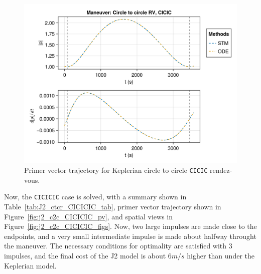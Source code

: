 \begin{figure}[htbp]
    \centering
    \includegraphics[width=\linewidth]{../results/j2/hohmann/CICIC_primer_vector.png}
    \caption{Primer vector trajectory for Keplerian circle to circle \texttt{CICIC} rendez-vous.}
    \label{fig:j2_c2c_CICIC_pv}
\end{figure}

Now, the \texttt{CICICIC} case is solved, with a summary shown in Table~\ref{tab:J2_ctcr_CICICIC_tab}, primer vector trajectory shown in Figure~\ref{fig:j2_c2c_CICICIC_pv}, and spatial views in Figure~\ref{fig:j2_c2c_CICICIC_figs}. Now, two large impulses are made close to the endpoints, and a very small intermediate impulse is made about halfway throught the maneuver. The necessary conditions for optimality are satisfied with 3 impulses, and the final cost of the J2 model is about \(6 m/s\) higher than under the Keplerian model.

